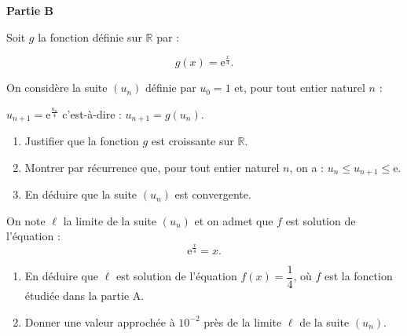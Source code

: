 \documentclass[10pt]{article}
\providecommand{\R}{\mathbb{R}}
\begin{document}
\bigskip

\textbf{Partie B}

\medskip

Soit $g$ la fonction définie sur $\R$ par : 

\[g(x) = \text{e}^{\frac{x}{4}}.\]

On considère la suite $\left(u_n\right)$ définie par $u_0 = 1$ et, pour tout entier naturel $n$ :

$u_{n+1} = \text{e}^{\frac{u_n}{4}}$ c'est-à-dire : $u_{n+1} = g\left(u_n\right)$.

\medskip

\begin{enumerate}
\item Justifier que la fonction $g$ est croissante sur $\R$.
\item Montrer par récurrence que, pour tout entier naturel $n$, on a : $u_n \leqslant  u_{n+1} \leqslant \text{e}$.
\item En déduire que la suite $\left(u_n\right)$ est convergente.
\end{enumerate}

On note $\ell$ la limite de la suite $\left(u_n\right)$ et on admet que $f$ est solution de l'équation : 
\[\text{e}^{\frac{x}{4}} = x.\]

\begin{enumerate}[resume]
\item En déduire que $\ell$ est solution de l'équation $f(x) = \dfrac14$, où $f$ est la fonction étudiée dans
la partie A.
\item Donner une valeur approchée à $10^{-2}$ près de la limite $\ell$ de la suite $\left(u_n\right)$.
\end{enumerate}

\bigskip
\end{document}
